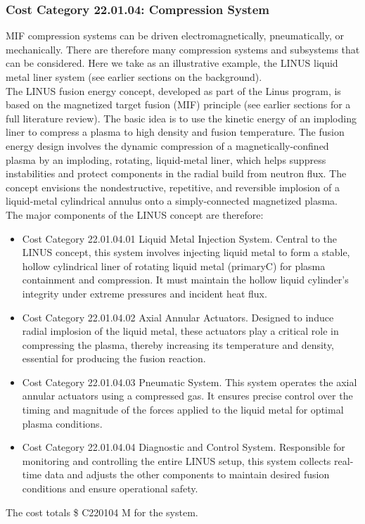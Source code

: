 \subsubsection*{Cost Category 22.01.04: Compression System}

MIF compression systems can be driven electromagnetically, pneumatically, or mechanically.  There are therefore many compression systems and subsystems that can be considered.  Here we take as an illustrative example, the LINUS liquid metal liner system (see earlier sections on the background).\\

The LINUS fusion energy concept, developed as part of the Linus program, is based on the magnetized target fusion (MIF) principle (see earlier sections for a full literature review). The basic idea is to use the kinetic energy of an imploding liner to compress a plasma to high density and fusion temperature. The fusion energy design involves the dynamic compression of a magnetically-confined plasma by an imploding, rotating, liquid-metal liner, which helps suppress instabilities and protect components in the radial build from neutron flux. The concept envisions the nondestructive, repetitive, and reversible implosion of a liquid-metal cylindrical annulus onto a simply-connected magnetized plasma.\\

The major components of the LINUS concept are therefore:

\begin{itemize}
  \item Cost Category 22.01.04.01 Liquid Metal Injection System. Central to the LINUS concept, this system involves injecting liquid metal to form a stable, hollow cylindrical liner of rotating liquid metal (primaryC) for plasma containment and compression. It must maintain the hollow liquid cylinder's integrity under extreme pressures and incident heat flux.

    \item Cost Category 22.01.04.02 Axial Annular Actuators. Designed to induce radial implosion of the liquid metal, these actuators play a critical role in compressing the plasma, thereby increasing its temperature and density, essential for producing the fusion reaction.

    \item Cost Category 22.01.04.03 Pneumatic System. This system operates the axial annular actuators using a compressed gas. It ensures precise control over the timing and magnitude of the forces applied to the liquid metal for optimal plasma conditions.

    \item Cost Category 22.01.04.04 Diagnostic and Control System. Responsible for monitoring and controlling the entire LINUS setup, this system collects real-time data and adjusts the other components to maintain desired fusion conditions and ensure operational safety.
\end{itemize}

The cost totals \$ C220104 M for the system.

